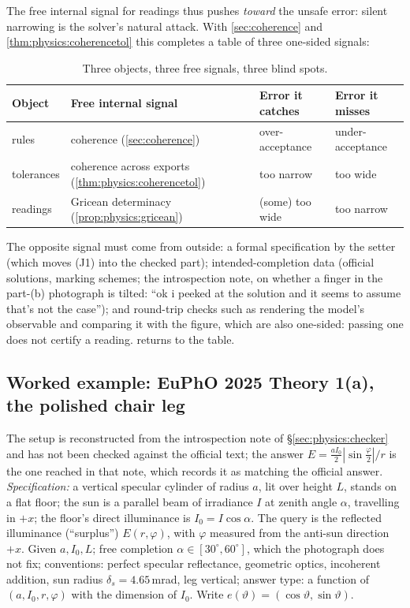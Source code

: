 The free internal signal for readings thus pushes \emph{toward} the unsafe error: silent
narrowing is the solver's natural attack. With \cref{sec:coherence} and
\cref{thm:physics:coherencetol} this completes a table of three one-sided signals:
\begin{table}[ht]\centering\small
\caption{Three objects, three free signals, three blind spots.}\label{tab:physics:onesided}
\begin{tabular}{@{}llll@{}}
\toprule
Object & Free internal signal & Error it catches & Error it misses\\
\midrule
rules & coherence (\cref{sec:coherence}) & over-acceptance & under-acceptance\\
tolerances & coherence across exports (\cref{thm:physics:coherencetol}) & too narrow & too wide\\
readings & Gricean determinacy (\cref{prop:physics:gricean}) & (some) too wide & too narrow\\
\bottomrule
\end{tabular}
\end{table}
The opposite signal must come from outside: a formal specification by the setter (which
moves (J1) into the checked part); intended-completion data (official solutions, marking
schemes; the introspection note, on whether a finger in the part-(b) photograph is tilted:
``ok i peeked at the solution and it seems to assume that's not the case''); and
round-trip checks such as rendering the model's observable and comparing it with the
figure, which are also one-sided: passing one does not certify a reading.
 returns to the table.

\subsection{Worked example: EuPhO 2025 Theory 1(a), the polished chair leg}\label{sec:physics:example}

The setup is reconstructed from the introspection note of \S\ref{sec:physics:checker} and
has not been checked against the official text; the answer
$E=\frac{aI_0}{2}|\sin\frac\varphi2|/r$ is the one reached in that note, which records it as
matching the official answer. \emph{Specification:} a vertical specular cylinder of radius
$a$, lit over height $L$, stands on a flat floor; the sun is a parallel beam of irradiance
$I$ at zenith angle $\alpha$, travelling in $+x$; the floor's direct illuminance is
$I_0=I\cos\alpha$. The query is the reflected illuminance (``surplus'') $E(r,\varphi)$, with
$\varphi$ measured from the anti-sun direction $+x$. Given $a,I_0,L$; free completion
$\alpha\in[30^\circ,60^\circ]$, which the photograph does not fix; conventions: perfect
specular reflectance, geometric optics, incoherent addition, sun radius
$\delta_s=4.65$\,mrad, leg vertical; answer type: a function of $(a,I_0,r,\varphi)$ with the
dimension of $I_0$. Write $e(\vartheta)=(\cos\vartheta,\sin\vartheta)$.

